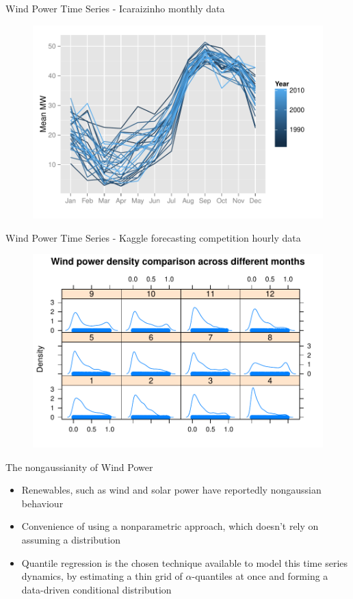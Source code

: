 \begin{frame}{Wind Power Time Series - Icaraizinho monthly data}

\begin{figure}
    \centering
    \includegraphics[width=0.9\linewidth]{Imagens/icaraizinho-mensal}
\end{figure}

\end{frame}

\begin{frame}{Wind Power Time Series - Kaggle forecasting competition
hourly data}

\begin{figure}
    \centering
    \includegraphics[width=0.9\linewidth]{Imagens/density}
\end{figure}

\end{frame}

\begin{frame}{The nongaussianity of Wind Power}

\begin{itemize}
\tightlist
\item
  Renewables, such as wind and solar power have reportedly nongaussian
  behaviour
\item
  Convenience of using a nonparametric approach, which doesn't rely on
  assuming a distribution
\item
  Quantile regression is the chosen technique available to model this
  time series dynamics, by estimating a thin grid of
  \(\alpha\)-quantiles at once and forming a data-driven conditional
  distribution
\end{itemize}

\end{frame}

